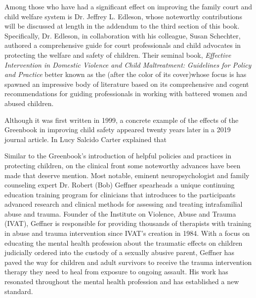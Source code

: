 Among those who have had a significant effect on improving the
family court and child welfare system is Dr. Jeffrey L. Edleson, whose
noteworthy contributions will be discussed at length in the addendum to
the third section of this book. Specifically, Dr. Edleson, in collaboration
with his colleague, Susan Schechter, authored a comprehensive guide
for court professionals and child advocates in protecting the welfare and
safety of children. Their seminal book, \textit{Effective Intervention in Domestic
Violence and Child Maltreatment: Guidelines for Policy and Practice}\mdash{}
better known as the  (after the color of its cover)\mdash{}whose
focus is \hspace{1pt} has spawned an impressive body of literature
based on its comprehensive and cogent recommendations for guiding
professionals in working with battered women and abused children. \pfl{}

Although it was first written in 1999, a concrete example of the effects of
the Greenbook in improving child safety appeared twenty years later
in a 2019 journal article. In 
Lucy Salcido Carter explained that \hspace{1pt} \pfl{}

Similar to the Greenbook's introduction of helpful policies and practices in protecting children, on the clinical front some noteworthy
advances have been made that deserve mention. Most notable, eminent neuropsychologist and family counseling expert Dr. Robert (Bob)
Geffner spearheads a unique continuing education training program
for clinicians that introduces to the participants advanced research and clinical methods
for assessing and treating intrafamilial abuse and trauma. Founder of
the Institute on Violence, Abuse and Trauma (IVAT),
Geffner is responsible for providing thousands of therapists with training in abuse and trauma intervention since IVAT's creation in 1984. With a focus on educating the mental health profession about the traumatic effects on children judicially ordered into the custody of a sexually abusive parent, 
Geffner has paved the way for children and adult survivors to receive the trauma intervention therapy they need to heal from
exposure to ongoing assault. His work has resonated throughout the
mental health profession and has established a new standard. \pfl{}

